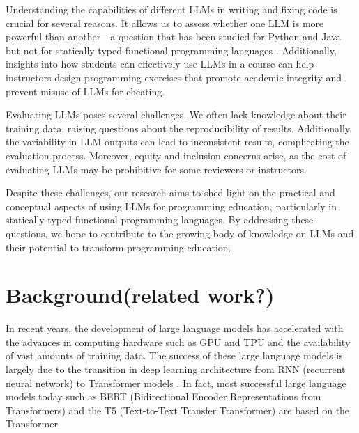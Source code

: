 \documentclass[sigconf,authordraft]{acmart}
\begin{document}
Understanding the capabilities of different LLMs in writing and fixing code is crucial for several reasons. It allows us to assess whether one LLM is more powerful than another—a question that has been studied for Python and Java but not for statically typed functional programming languages . Additionally, insights into how students can effectively use LLMs in a course can help instructors design programming exercises that promote academic integrity and prevent misuse of LLMs for cheating.

Evaluating LLMs poses several challenges. We often lack knowledge about their training data, raising questions about the reproducibility of results. Additionally, the variability in LLM outputs can lead to inconsistent results, complicating the evaluation process. Moreover, equity and inclusion concerns arise, as the cost of evaluating LLMs may be prohibitive for some reviewers or instructors.

Despite these challenges, our research aims to shed light on the practical and conceptual aspects of using LLMs for programming education, particularly in statically typed functional programming languages. By addressing these questions, we hope to contribute to the growing body of knowledge on LLMs and their potential to transform programming education.

\section{Background(related work?)}



In recent years, the development of large language models has accelerated with the advances in computing hardware such as GPU and TPU and the availability of vast amounts of training data. The success of these large language models is largely due to the transition in deep learning architecture from RNN (recurrent neural network) \cite{RNN} to Transformer models \cite{Transformer}. In fact, most successful large language models today such as BERT (Bidirectional Encoder Representations from Transformers) \cite{BERT} and the T5 (Text-to-Text Transfer Transformer) \cite{T5} are based on the Transformer. %
\end{document}
